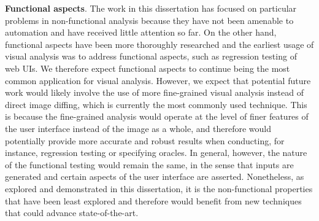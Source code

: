 {\textbf{Functional aspects}.} 
The work in this dissertation has focused on particular problems in non-functional analysis 
because they have not been amenable to automation and have received little attention so far. 
On the other hand, functional aspects have been more thoroughly researched and the earliest usage 
of visual analysis was to address functional aspects, such as regression testing of web UIs. 
We therefore expect functional aspects to continue being the most common application for visual analysis. 
However, we expect that potential future work would likely involve the use of more fine-grained visual analysis instead of direct image diffing, which is currently the most commonly used technique. This is because the fine-grained analysis would operate at the level of finer features of the user interface instead of the image as a whole, and therefore would potentially provide more accurate and robust results when conducting, for instance, regression testing or specifying oracles. In general, however, the nature of the functional testing 
would remain the same, in the sense that inputs are generated and certain aspects of the user 
interface are asserted. 
Nonetheless, as explored and demonstrated in this dissertation, it is the non-functional properties that have been least explored and therefore would benefit from new techniques that could advance state-of-the-art. 


\starttocentries

